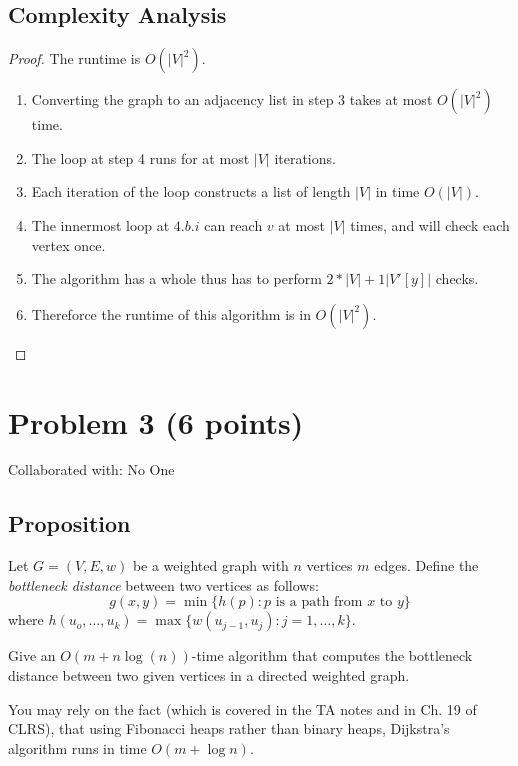 \documentclass{article}
\begin{document}
\subsection{Complexity Analysis}
\begin{proof} The runtime is \(O(|V|^2)\).
      \begin{enumerate}
            \item Converting the graph to an adjacency list in step 3 takes at most
                  \(O(|V|^2)\) time.
            \item The loop at step 4 runs for at most \(|V|\) iterations.
            \item Each iteration of the loop constructs a list of length \(|V|\) in time \(O(|V|)\).
            \item The innermost loop at \(4.b.i\) can reach \(v\) at most \(|V|\) times,
                  and will check each vertex once.
            \item The algorithm has a whole thus has to perform \(2 *|V| + 1 |V'[y]|\)
                  checks.
            \item Thereforce the runtime of this algorithm is in \(O(|V|^2)\).
      \end{enumerate}

\end{proof}

\newpage
\section{Problem 3 (6 points)}
Collaborated with: No One

\subsection{Proposition}
Let \(G=(V,E,w)\) be a weighted graph with \(n\) vertices \(m\) edges. Define the
\textit{bottleneck distance} between two vertices as follows:
\[g(x,y) = \min \{ h(p) : p \text{ is a path from } x \text{ to } y \} \]
where \(h(u_o,\ldots,u_k) = \max \{ w(u_{j-1}, u_j) : j=1,\ldots,k \} \).

Give an \(O(m +  n \log (n))\)-time algorithm that computes the bottleneck distance
between two given vertices in a directed weighted graph.

You may rely on the fact (which is covered in the TA notes and in Ch. 19 of CLRS), that
using Fibonacci heaps rather than binary heaps, Dijkstra's algorithm runs in time \(O(m +
\log n)\).
\end{document}
